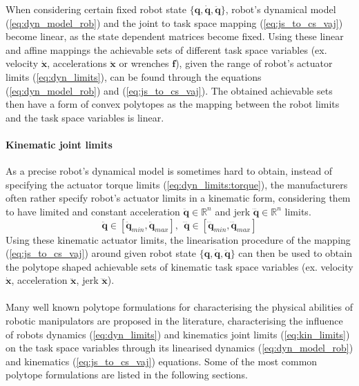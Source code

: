When considering certain fixed robot state $\{\bm{q},\dot{\bm{q}},\ddot{\bm{q}}\}$, robot's dynamical model (\ref{eq:dyn_model_rob}) and the joint to task space mapping (\ref{eq:js_to_cs_vaj}) become linear, as the state dependent matrices become fixed. Using these linear and affine mappings the achievable sets of different task space variables (ex. velocity $\dot{\bm{x}}$, accelerations $\ddot{\bm{x}}$ or wrenches $\bm{f}$), given the range of robot's actuator limits (\ref{eq:dyn_limits}), can be found through the equations (\ref{eq:dyn_model_rob}) and (\ref{eq:js_to_cs_vaj}). The obtained achievable sets then have a form of convex polytopes as the mapping between the robot limits and the task space variables is linear.


\paragraph*{Kinematic joint limits} As a precise robot's dynamical model is sometimes hard to obtain, instead of specifying the actuator torque limits (\ref{eq:dyn_limits:torque}), the manufacturers often rather specify robot's actuator limits in a kinematic form, considering them to have limited and constant acceleration $\ddot{\bm{q}} \in \mathbb{R}^n$ and jerk $\dddot{\bm{q}} \in \mathbb{R}^n$ limits.
\begin{equation}
\ddot{\bm{q}} \in [\ddot{\bm{q}}_{min}, \ddot{\bm{q}}_{max}], ~~ \dddot{\bm{q}} \in [ \dddot{\bm{q}}_{min}, \dddot{\bm{q}}_{max}] 
\label{eq:kin_limits}
\end{equation}
Using these kinematic actuator limits, the linearisation procedure of the mapping (\ref{eq:js_to_cs_vaj}) around given robot state $\{\bm{q},\dot{\bm{q}},\ddot{\bm{q}}\}$ can then be used to obtain the polytope shaped achievable sets of kinematic task space variables (ex. velocity $\dot{\bm{x}}$, acceleration $\ddot{\bm{x}}$, jerk $\dddot{\bm{x}}$).



\paragraph*{} Many well known polytope formulations for characterising the physical abilities of robotic manipulators are proposed in the literature, characterising the influence of robots dynamics (\ref{eq:dyn_limits}) and kinematics joint limits (\ref{eq:kin_limits}) on the task space variables through its linearised dynamics (\ref{eq:dyn_model_rob}) and kinematics (\ref{eq:js_to_cs_vaj}) equations. Some of the most common polytope formulations are listed in the following sections.

